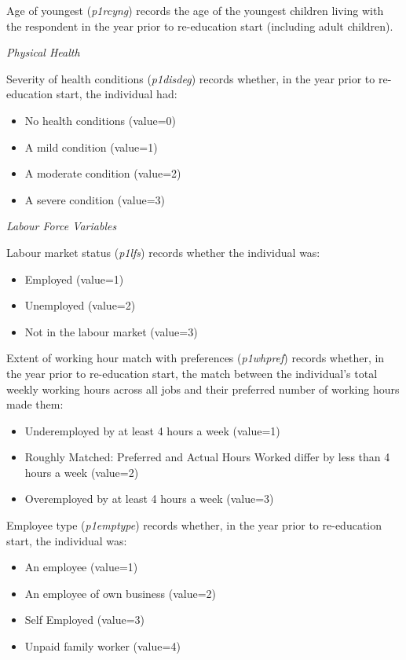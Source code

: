 \documentclass[12pt, a4paper]{article}
\begin{document}
Age of youngest (\textit{p1\textunderscore{}rcyng}) records the age of the youngest children living with the respondent in the year prior to re-education start (including adult children). 

\emph{Physical Health}

Severity of health conditions (\textit{p1\textunderscore{}disdeg}) records whether, in the year prior to re-education start, the individual had:
\begin{itemize}
  \item No health conditions (value=0)
  \item A mild condition (value=1)
  \item A moderate condition (value=2)
  \item A severe condition (value=3)
\end{itemize}  
  
\emph{Labour Force Variables}

Labour market status (\textit{p1\textunderscore{}lfs}) records whether the individual was:
\begin{itemize}
  \item Employed (value=1)
  \item Unemployed (value=2)
  \item Not in the labour market (value=3)
\end{itemize} 

Extent of working hour match with preferences (\textit{p1\textunderscore{}whpref}) records whether, in the year prior to re-education start, the match between the individual’s total weekly working hours across all jobs and their preferred number of working hours made them:
\begin{itemize}
  \item Underemployed by at least 4 hours a week (value=1)
  \item Roughly Matched: Preferred and Actual Hours Worked differ by less than 4 hours a week (value=2)
  \item Overemployed by at least 4 hours a week (value=3)
\end{itemize}  

Employee type (\textit{p1\textunderscore{}emptype}) records whether, in the year prior to re-education start, the individual was:
\begin{itemize}
  \item An employee (value=1)
  \item An employee of own business (value=2)
  \item Self Employed (value=3)
  \item Unpaid family worker (value=4)
\end{itemize}  
\end{document}
